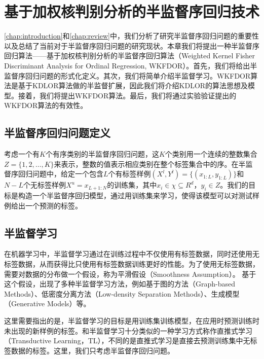 \chapter{基于加权核判别分析的半监督序回归技术}
\label{chap:wkfdor}

\autoref{chap:introduction}和\autoref{chap:review}中，我们分析了研究半监督序回归问题的重要性以及总结了当前对于半监督序回归问题的研究现状。本章我们将提出一种半监督序回归算法——基于加权核判别分析的半监督序回归算法（Weighted Kernel Fisher Discriminant Analysis for Ordinal Regression, WKFDOR）。首先，我们将给出半监督序回归问题的形式化定义。其次，我们将简单介绍半监督学习。WKFDOR算法是基于KDLOR算法\citep{sun2010kernel}做的半监督扩展，因此我们将介绍KDLOR的算法思想及模型。接着，我们将提出WKFDOR算法。最后，我们将通过实验验证提出的WKFDOR算法的有效性。

\section{半监督序回归问题定义}
考虑一个有\(K\)个有序类别的半监督序回归问题，这\(K\)个类别用一个连续的整数集合 \(Z=\{1,2,\dots,K\}\)来表示，整数的值表示相应类别在整个标签集合中的序。在半监督序回归问题中，给定一个包含\(L\)个有标签样例\((X^{l},Y^{l})=\{(x_{1:L},y_{1:L})\}\)和\(N-L\)个无标签样例\(X^{u} = {x_{L+1:N}}\)的训练集，其中\(x_{i} \in \chi \subseteq R^{d}\)，\(y_{i} \in Z\)。我们的目标是构造一个半监督序回归模型，通过用训练集来学习，使得该模型可以对测试样例给出一个预测的标签。

\section{半监督学习}
在机器学习中，半监督学习通过在训练过程中不仅使用有标签数据，同时还使用无标签数据，从而获得比只使用有标签数据训练更好的性能。为了使用无标签数据，需要对数据的分布做一个假设，称为平滑假设（Smoothness Assumption）\citep{chapelle2006semi}。
基于这个假设，出现了多种半监督学习方法，例如基于图的方法（Graph-based Methods）、低密度分离方法（Low-density Separation Methods）、生成模型（Generative Models）等\citep{zhu2005semi}。

这里需要指出的是，半监督学习的目标是用训练集训练模型，在应用时预测训练时未出现的新样例的标签。和半监督学习十分类似的一种学习方式称作直推式学习（Transductive Learning，TL），不同的是直推式学习是直接去预测训练集中无标签数据的标签。这里，我们只考虑半监督序回归问题。

